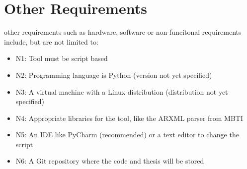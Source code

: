 \section{Other Requirements}
\label{sec:hardware-software}

other requirements such as hardware, software or non-funcitonal requirements include, but are not limited to:

\begin{itemize}
	\item N1\label{sec:n1}: Tool must be script based
	\item N2\label{sec:n2}: Programming language is Python (version not yet specified)
	\item N3\label{sec:n3}: A virtual machine with a Linux distribution (distribution not yet specified)
	\item N4\label{sec:n4}: Appropriate libraries for the tool, like the ARXML parser from MBTI
	\item N5\label{sec:n5}: An IDE like PyCharm (recommended) or a text editor to change the script
	\item N6\label{sec:n6}: A Git repository where the code and thesis will be stored
\end{itemize}
